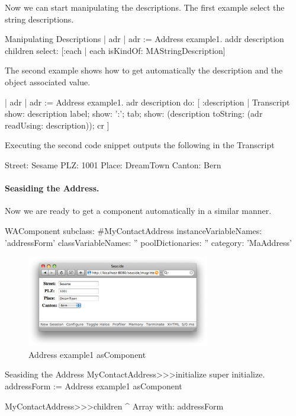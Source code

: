 \documentclass[a4paper,10pt,twoside]{book}
\begin{document}
Now we can start manipulating the descriptions. The first example select the string descriptions.


\begin{code}{Manipulating Descriptions}
| adr |
adr := Address example1.
addr description children select: [:each | each isKindOf: MAStringDescription]
\end{code}


The second example shows how to get automatically the description and the object associated value. 

\begin{code}{}
| adr |
adr := Address example1.
adr description do: [ :description |
		Transcript
			show: description label; show: ':'; tab;
			show: (description toString: (adr readUsing: description));
			cr ]
\end{code}
Executing the second code snippet outputs the following in the Transcript

\begin{code}{}
Street:	Sesame
PLZ:	1001
Place:	DreamTown
Canton:	Bern
\end{code}

\paragraph{Seasiding the Address.}
Now we are ready to get a \Seaside component automatically in a similar manner. 

\begin{classdef}{}
WAComponent subclass: #MyContactAddress
	instanceVariableNames: 'addressForm'
	classVariableNames: ''
	poolDictionaries: ''
	category: 'MaAddress'
\end{classdef}

\begin{figure}[ht]
\begin{center}
\includegraphics[width=8cm]{addressUI}
\caption{Address example1 asComponent}
\end{center}
\end{figure}

\begin{method}{Seasiding the Address}
MyContactAddress>>>initialize
	super initialize.
	addressForm := Address example1 asComponent

MyContactAddress>>>children
	^ Array with: addressForm
\end{method}
\end{document}
